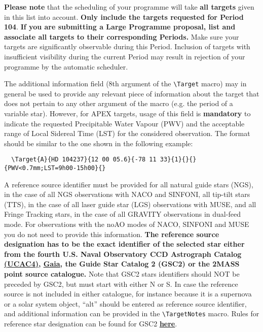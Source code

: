 \documentclass{article}
\begin{document}
{\bf Please note} that the scheduling of your programme will take
{\bf all targets} given in this list into account. {\bf Only include
 the targets requested for Period 104}.
{\bf If you are submitting a Large Programme proposal, list and associate all targets to their corresponding Periods.}
Make sure your targets are significantly observable during this Period. Inclusion of targets with insufficient visibility during the current Period may result in
rejection of your programme by the automatic scheduler.

The additional information field (8th argument of the \verb|\Target|
macro) may in general be used to provide any relevant piece of
information about the target that does not pertain to any other
argument of the macro (e.g. the period of a variable star). However,
for APEX targets, usage of this field is {\bf mandatory} to indicate the
requested Precipitable Water Vapour (PWV) and the acceptable range of
Local Sidereal Time (LST) for the considered observation. The format
should be similar to the one shown in the following example:
\begin{verbatim}
  \Target{A}{HD 104237}{12 00 05.6}{-78 11 33}{1}{}{}{PWV<0.7mm;LST=9h00-15h00}{}
\end{verbatim}


A reference source identifier must be provided for all natural guide 
stars (NGS), in the case of all NGS observations with NACO and SINFONI, 
all tip-tilt stars (TTS), in the case of all laser guide star (LGS)
observations with MUSE, and all Fringe Tracking stars, in the case
of all GRAVITY observations in dual-feed mode.
For observations with the noAO modes of NACO, SINFONI and MUSE 
you do not need to provide this information. {\bf The reference source
designation has to be the exact identifier of the selected star
either from the fourth U.S. Naval Observatory CCD Astrograph Catalog \href{http://cdsarc.u-strasbg.fr/viz-bin/Cat?I/322A}{\underline {(UCAC4)}}, \href{http://vizier.u-strasbg.fr/viz-bin/VizieR-3}{\underline {Gaia}}, the Guide Star Catalog 2 (GSC2) or the 2MASS point source catalogue.} Note that GSC2 stars identifiers should NOT be preceded
by GSC2, but must start with either N or S. In case the reference source is not
included in either catalogue, for instance because it is a supernova or
a solar system object, ``alt'' should be entered as reference source
identifier, and additional information can be provided in the
\verb|\TargetNotes| macro.
Rules for reference star designation can be found for GSC2 
\href{http://vizier.u-strasbg.fr/viz-bin/VizieR-n?-source=METAnot&catid=1271&notid=1&-out=text}{\bf\underline{here}}. 
\end{document}
